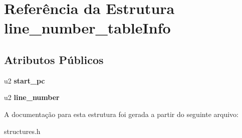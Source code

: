\hypertarget{structline__number__tableInfo}{}\section{Referência da Estrutura line\+\_\+number\+\_\+table\+Info}
\label{structline__number__tableInfo}
\subsection*{Atributos Públicos}
\begin{DoxyCompactItemize}
\item 
\mbox{\label{structline__number__tableInfo_a09fe2870e59f80caeeb2b2473e9c07f0}} 
u2 {\bfseries start\+\_\+pc}
\item 
\mbox{\label{structline__number__tableInfo_a3c73371368db11b50865dd474b9e2a7b}} 
u2 {\bfseries line\+\_\+number}
\end{DoxyCompactItemize}


A documentação para esta estrutura foi gerada a partir do seguinte arquivo\+:\begin{DoxyCompactItemize}
\item 
structures.\+h\end{DoxyCompactItemize}
